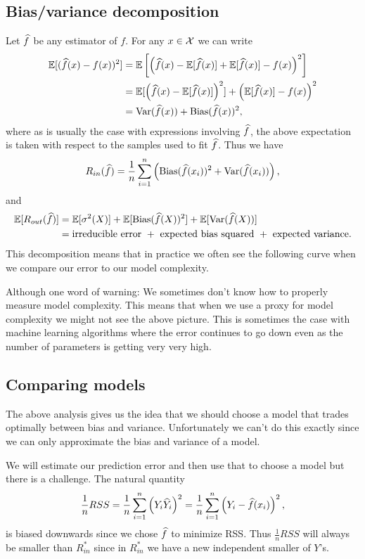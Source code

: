  \subsection{Bias/variance decomposition}
 Let $\widehat{f}$ be any estimator of $f$. For any $x \in {\mathcal{X}}$ we can write
 \begin{align*}
     {\mathbb{E}}[(\widehat{f}(x)-f(x))^2] &= {\mathbb{E}}\left[\left(\widehat{f}(x)-{\mathbb{E}}[\widehat{f}(x)]+{\mathbb{E}}[\widehat{f}(x)]-f(x)\right)^2\right]\\
     &= {\mathbb{E}}[\left(\widehat{f}(x)-{\mathbb{E}}[\widehat{f}(x)]\right)^2]+\left({\mathbb{E}}[\widehat{f}(x)]-f(x)\right)^2\\
     &= \operatorname{Var}(\widehat{f}(x))+\operatorname*{Bias}(\widehat{f}(x))^2,
 \end{align*}
where as is usually the case with expressions involving $\widehat{f}$, the above expectation is taken with respect to the samples used to fit $\widehat{f}$. Thus we have
\[R_{in}(\widehat{f})= \frac{1}{n}\sum_{i=1}^n \left(\operatorname*{Bias}(\widehat{f}(x_i))^2+\operatorname{Var}(\widehat{f}(x_i))\right),\]
and 
\begin{align*}
    {\mathbb{E}}[R_{out}(\widehat{f})]&= {\mathbb{E}}[\sigma^2(X)]+{\mathbb{E}}[\operatorname*{Bias}(\widehat{f}(X))^2]+{\mathbb{E}}[\operatorname{Var}(\widehat{f}(X))]\\
    &= \text{irreducible error }+\text{ expected bias squared }+\text{ expected variance}. 
\end{align*}
This decomposition means that in practice we often see the following curve when we compare our error to our model complexity.

\begin{center}
    
\end{center}
Although one word of warning: We sometimes don't know how to properly measure model complexity. This means that when we use a proxy for model complexity we might not see the above picture. This is sometimes the case with machine learning algorithms where the error continues to go down even as the number of parameters is getting very very high.

\subsection{Comparing models}
The above analysis gives us the idea that we should choose a model that trades optimally between bias and variance. Unfortunately we can't do this exactly since we can only approximate the bias and variance of a model. 

We will estimate our prediction error and then use that to choose a model but there is a challenge. The natural quantity
\[\frac{1}{n}RSS = \frac{1}{n}\sum_{i=1}^n \left(Y_i  \widehat{Y}_i\right)^2 = \frac{1}{n}\sum_{i=1}^n \left(Y_i-\widehat{f}(x_i)\right)^2, \]
is biased downwards since we chose $\widehat{f}$ to minimize RSS. Thus $\frac{1}{n}RSS$ will always be smaller than $R_{in}^*$ since in $R_{in}^*$ we have a new independent smaller of $Y$'s.


